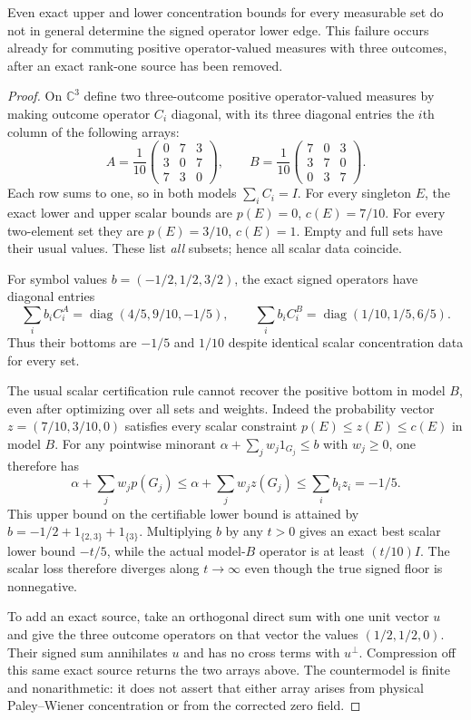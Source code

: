 \begin{proposition}
\label{ns43-conc-prop-scalar}
Even exact upper and lower concentration bounds for every measurable
set do not in general determine the signed operator lower edge.
This failure occurs already for commuting positive operator-valued
measures with three outcomes, after an exact rank-one source has
been removed.
\end{proposition}
\begin{proof}
On $\mathbb C^3$ define two three-outcome positive operator-valued
measures by making outcome operator $C_i$ diagonal, with its three
diagonal entries the $i$th column of the following arrays:
\[
 A=\frac1{10}
 \begin{pmatrix}0&7&3\\3&0&7\\7&3&0\end{pmatrix},
 \qquad
 B=\frac1{10}
 \begin{pmatrix}7&0&3\\3&7&0\\0&3&7\end{pmatrix}.
\]
Each row sums to one, so in both models $\sum_iC_i=I$.
For every singleton $E$, the exact lower and upper scalar bounds are
$p(E)=0$, $c(E)=7/10$. For every two-element set they are
$p(E)=3/10$, $c(E)=1$. Empty and full sets have their usual values.
These list \emph{all} subsets; hence all scalar data coincide.

For symbol values $b=(-1/2,1/2,3/2)$, the exact signed operators have
diagonal entries
\[
 \sum_i b_i C_i^A=\operatorname{diag}(4/5,9/10,-1/5),
 \qquad
 \sum_i b_i C_i^B=\operatorname{diag}(1/10,1/5,6/5).
\]
Thus their bottoms are $-1/5$ and $1/10$ despite identical scalar
concentration data for every set.

The usual scalar certification rule cannot recover the positive
bottom in model $B$, even after optimizing over all sets and weights.
Indeed the probability vector $z=(7/10,3/10,0)$ satisfies every
scalar constraint $p(E)\le z(E)\le c(E)$ in model $B$.
For any pointwise minorant
$\alpha+\sum_jw_j1_{G_j}\le b$ with $w_j\ge0$, one therefore has
\[
 \alpha+\sum_jw_jp(G_j)
 \le\alpha+\sum_jw_jz(G_j)\le\sum_i b_i z_i=-1/5.
\]
This upper bound on the certifiable lower bound is attained by
$b=-1/2+1_{\{2,3\}}+1_{\{3\}}$.
Multiplying $b$ by any $t>0$ gives an exact best scalar lower bound
$-t/5$, while the actual model-$B$ operator is at least $(t/10)I$.
The scalar loss therefore diverges along $t\to\infty$ even though
the true signed floor is nonnegative.

To add an exact source, take an orthogonal direct sum with one unit
vector $u$ and give the three outcome operators on that vector the
values $(1/2,1/2,0)$. Their signed sum annihilates $u$ and has no
cross terms with $u^\perp$. Compression off this same exact source
returns the two arrays above. The countermodel is finite and
nonarithmetic: it does not assert that either array arises from
physical Paley--Wiener concentration or from the corrected zero field.
\end{proof}

